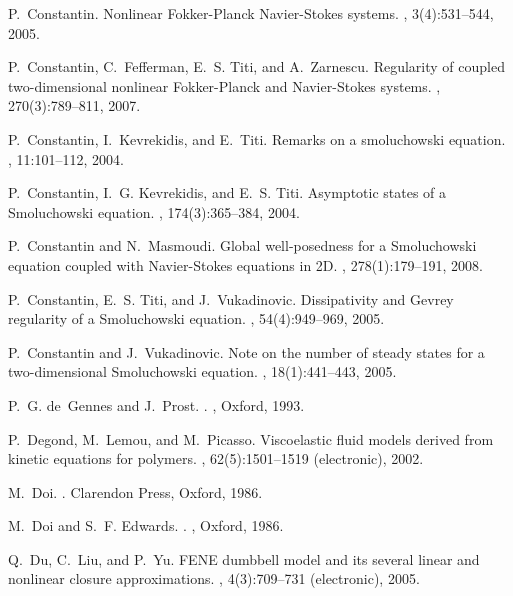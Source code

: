 \documentclass[reqno]{amsart}
\numberwithin{equation}{section}
\theoremstyle{definition}
\theoremstyle{remark}
\begin{document}
\begin{thebibliography}{99}
P.~Constantin.
\newblock Nonlinear {F}okker-{P}lanck {N}avier-{S}tokes systems.
, 3(4):531--544, 2005.

P.~Constantin, C.~Fefferman, E.~S. Titi, and A.~Zarnescu.
\newblock Regularity of coupled two-dimensional nonlinear {F}okker-{P}lanck and
  {N}avier-{S}tokes systems.
, 270(3):789--811, 2007.

P.~Constantin, I.~Kevrekidis, and E.~Titi.
\newblock Remarks on a smoluchowski equation.
, 11:101--112, 2004.

P.~Constantin, I.~G. Kevrekidis, and E.~S. Titi.
\newblock Asymptotic states of a {S}moluchowski equation.
, 174(3):365--384, 2004.

P.~Constantin and N.~Masmoudi.
\newblock Global well-posedness for a {S}moluchowski equation coupled with
  {N}avier-{S}tokes equations in 2{D}.
, 278(1):179--191, 2008.

P.~Constantin, E.~S. Titi, and J.~Vukadinovic.
\newblock Dissipativity and {G}evrey regularity of a {S}moluchowski equation.
, 54(4):949--969, 2005.

P.~Constantin and J.~Vukadinovic.
\newblock Note on the number of steady states for a two-dimensional
  {S}moluchowski equation.
, 18(1):441--443, 2005.

P.~G. de~Gennes and J.~Prost.
.
, Oxford, 1993.

P.~Degond, M.~Lemou, and M.~Picasso.
\newblock Viscoelastic fluid models derived from kinetic equations for
  polymers.
, 62(5):1501--1519 (electronic), 2002.

M.~Doi.
.
\newblock Clarendon Press, Oxford, 1986.

M.~Doi and S.~F. Edwards.
.
, Oxford, 1986.

Q.~Du, C.~Liu, and P.~Yu.
\newblock F{ENE} dumbbell model and its several linear and nonlinear closure
  approximations.
, 4(3):709--731 (electronic), 2005.


\end{thebibliography}
\end{document}
